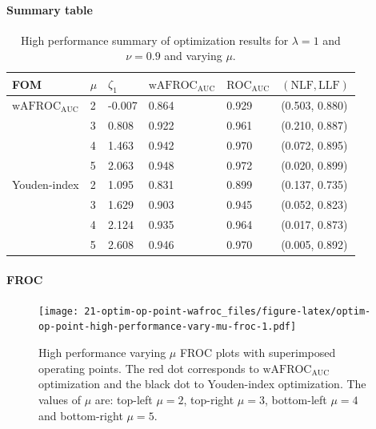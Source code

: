 \documentclass[
]{book}
\begin{document}
\hypertarget{summary-table-4}{%
\paragraph{Summary table}\label{summary-table-4}}

\begin{table}

\caption{\label{tab:optim-op-point-high-performance-vary-mu-table}High performance summary of optimization results for $\lambda = 1$ and $\nu = 0.9$ and varying $\mu$.}
\centering
\fontsize{10}{12}\selectfont
\begin{tabular}[t]{llllll}
\toprule
FOM & $\mu$ & $\zeta_1$ & $\text{wAFROC}_\text{AUC}$ & $\text{ROC}_\text{AUC}$ & $\left( \text{NLF}, \text{LLF}\right)$\\
\midrule
$\text{wAFROC}_\text{AUC}$ & 2 & -0.007 & 0.864 & 0.929 & (0.503, 0.880)\\
 & 3 & 0.808 & 0.922 & 0.961 & (0.210, 0.887)\\
 & 4 & 1.463 & 0.942 & 0.970 & (0.072, 0.895)\\
 & 5 & 2.063 & 0.948 & 0.972 & (0.020, 0.899)\\
Youden-index & 2 & 1.095 & 0.831 & 0.899 & (0.137, 0.735)\\
\addlinespace
 & 3 & 1.629 & 0.903 & 0.945 & (0.052, 0.823)\\
 & 4 & 2.124 & 0.935 & 0.964 & (0.017, 0.873)\\
 & 5 & 2.608 & 0.946 & 0.970 & (0.005, 0.892)\\
\bottomrule
\end{tabular}
\end{table}

\hypertarget{froc-5}{%
\paragraph{FROC}\label{froc-5}}

\begin{figure}
\centering
\texttt{[image: 21-optim-op-point-wafroc\_files/figure-latex/optim-op-point-high-performance-vary-mu-froc-1.pdf]}
\caption{\label{fig:optim-op-point-high-performance-vary-mu-froc}High performance varying \(\mu\) FROC plots with superimposed operating points. The red dot corresponds to \(\text{wAFROC}_\text{AUC}\) optimization and the black dot to Youden-index optimization. The values of \(\mu\) are: top-left \(\mu = 2\), top-right \(\mu = 3\), bottom-left \(\mu = 4\) and bottom-right \(\mu = 5\).}
\end{figure}
\end{document}
